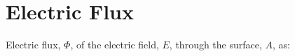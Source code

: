 \documentclass{article}
\begin{document}
\setlength{\parindent}{0pt}
\setlength{\parskip}{1em}

\section*{Electric Flux}
Electric flux, $\Phi$, of the electric field, $E$, through the surface, $A$, as: 
\end{document}
